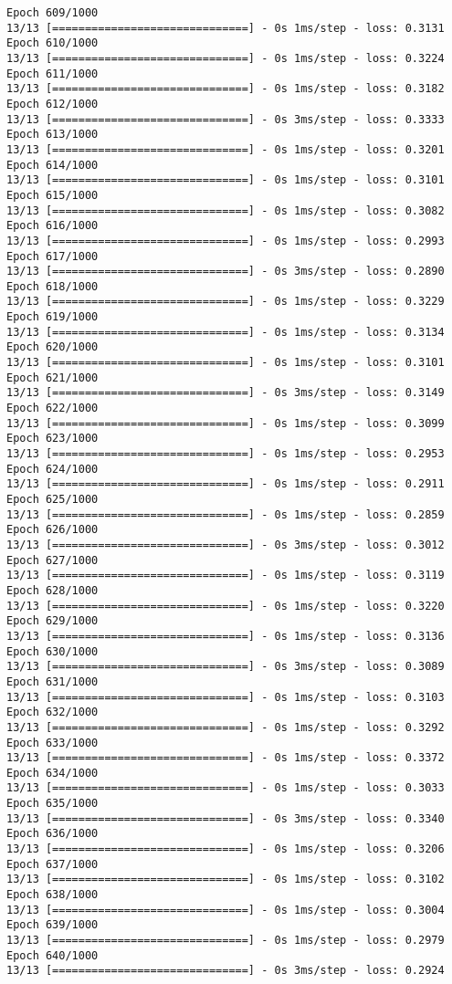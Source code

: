 \documentclass[11pt]{article}
\begin{document}
\begin{Verbatim}[commandchars=\\\{\}]
Epoch 609/1000
13/13 [==============================] - 0s 1ms/step - loss: 0.3131
Epoch 610/1000
13/13 [==============================] - 0s 1ms/step - loss: 0.3224
Epoch 611/1000
13/13 [==============================] - 0s 1ms/step - loss: 0.3182
Epoch 612/1000
13/13 [==============================] - 0s 3ms/step - loss: 0.3333
Epoch 613/1000
13/13 [==============================] - 0s 1ms/step - loss: 0.3201
Epoch 614/1000
13/13 [==============================] - 0s 1ms/step - loss: 0.3101
Epoch 615/1000
13/13 [==============================] - 0s 1ms/step - loss: 0.3082
Epoch 616/1000
13/13 [==============================] - 0s 1ms/step - loss: 0.2993
Epoch 617/1000
13/13 [==============================] - 0s 3ms/step - loss: 0.2890
Epoch 618/1000
13/13 [==============================] - 0s 1ms/step - loss: 0.3229
Epoch 619/1000
13/13 [==============================] - 0s 1ms/step - loss: 0.3134
Epoch 620/1000
13/13 [==============================] - 0s 1ms/step - loss: 0.3101
Epoch 621/1000
13/13 [==============================] - 0s 3ms/step - loss: 0.3149
Epoch 622/1000
13/13 [==============================] - 0s 1ms/step - loss: 0.3099
Epoch 623/1000
13/13 [==============================] - 0s 1ms/step - loss: 0.2953
Epoch 624/1000
13/13 [==============================] - 0s 1ms/step - loss: 0.2911
Epoch 625/1000
13/13 [==============================] - 0s 1ms/step - loss: 0.2859
Epoch 626/1000
13/13 [==============================] - 0s 3ms/step - loss: 0.3012
Epoch 627/1000
13/13 [==============================] - 0s 1ms/step - loss: 0.3119
Epoch 628/1000
13/13 [==============================] - 0s 1ms/step - loss: 0.3220
Epoch 629/1000
13/13 [==============================] - 0s 1ms/step - loss: 0.3136
Epoch 630/1000
13/13 [==============================] - 0s 3ms/step - loss: 0.3089
Epoch 631/1000
13/13 [==============================] - 0s 1ms/step - loss: 0.3103
Epoch 632/1000
13/13 [==============================] - 0s 1ms/step - loss: 0.3292
Epoch 633/1000
13/13 [==============================] - 0s 1ms/step - loss: 0.3372
Epoch 634/1000
13/13 [==============================] - 0s 1ms/step - loss: 0.3033
Epoch 635/1000
13/13 [==============================] - 0s 3ms/step - loss: 0.3340
Epoch 636/1000
13/13 [==============================] - 0s 1ms/step - loss: 0.3206
Epoch 637/1000
13/13 [==============================] - 0s 1ms/step - loss: 0.3102
Epoch 638/1000
13/13 [==============================] - 0s 1ms/step - loss: 0.3004
Epoch 639/1000
13/13 [==============================] - 0s 1ms/step - loss: 0.2979
Epoch 640/1000
13/13 [==============================] - 0s 3ms/step - loss: 0.2924

\end{Verbatim}
\end{document}
